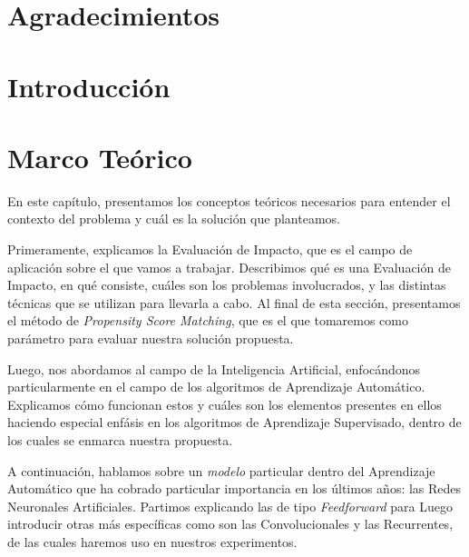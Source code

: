 \documentclass[a4paper,12pt,spanish]{book}
\begin{document}


\cleardoublepage


\clearpage

\thispagestyle{empty}
\chapter*{Agradecimientos}
\clearpage

\tableofcontents
\clearpage

\chapter{Introducción}


\chapter{Marco Teórico}
En este capítulo, presentamos los conceptos teóricos necesarios para entender el contexto
del problema y cuál es la solución que planteamos.

Primeramente, explicamos la Evaluación de Impacto, que es el campo de aplicación sobre el
que vamos a trabajar. Describimos qué es una Evaluación de Impacto, en qué consiste,
cuáles son los problemas involucrados, y las distintas técnicas que se utilizan para
llevarla a cabo. Al final de esta sección, presentamos el método de \textit{Propensity
Score Matching}, que es el que tomaremos como parámetro para evaluar nuestra solución
propuesta.

Luego, nos abordamos al campo de la Inteligencia Artificial, enfocándonos particularmente
en el campo de los algoritmos de Aprendizaje Automático. Explicamos cómo funcionan estos y
cuáles son los elementos presentes en ellos haciendo especial enfásis en los algoritmos de
Aprendizaje Supervisado, dentro de los cuales se enmarca nuestra propuesta.

A continuación, hablamos sobre un \textit{modelo} particular dentro del Aprendizaje
Automático que ha cobrado particular importancia en los últimos años: las Redes Neuronales
Artificiales. Partimos explicando las de tipo \textit{Feedforward} para Luego introducir
otras más específicas como son las Convolucionales y las Recurrentes, de las cuales
haremos uso en nuestros experimentos.
\end{document}

